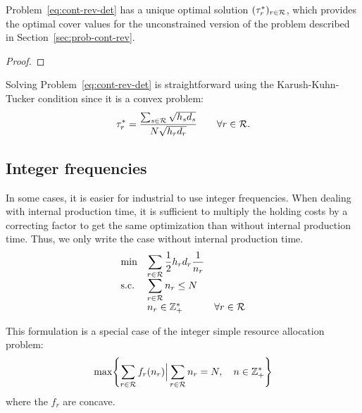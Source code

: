 \begin{prop}
Problem~\eqref{eq:cont-rev-det} has a unique optimal solution $(\tau_r^*)_{r\in\mathcal{R}}$, which provides the optimal cover values for the unconstrained version of the problem described in Section~\ref{sec:prob-cont-rev}.
\end{prop}

\begin{proof}
\tbc
\end{proof}

Solving Problem~\eqref{eq:cont-rev-det} is straightforward using the Karush-Kuhn-Tucker condition since it is a convex problem:
$$\tau_r^*= \frac{\sum_{s\in\mathcal{R}}\sqrt{h_sd_s}}{N\sqrt{h_rd_r}}\qquad\forall r\in\mathcal{R}.$$





\subsection{Integer frequencies}


In some cases, it is easier for industrial to use integer frequencies. When dealing with internal production time, it is sufficient to multiply the holding costs by a correcting factor to get the same optimization than without internal production time. Thus, we only write the case without internal production time.
\begin{equation}
  \begin{array}{lll}
  \min & \displaystyle\sum_{r\in\mathcal{R}} \frac{1}{2}h_rd_r\frac{1}{n_r} \\
  \text{s.c.}  & \displaystyle\sum_{r\in\mathcal{R}} n_r \le N \\
       & n_r \in \mathbb{Z}_+^* & \forall r\in\mathcal{R}
  \end{array}
\end{equation}

This formulation is a special case of the integer simple resource allocation problem:
\begin{equation}
  \max\crbracket{\sum_{r\in\REF} f_r\bracket{\freq_r} \Big| \sum_{r\in\REF}\freq_r=\nbsetups,\quad\freq\in \ZZ_+^*}
\end{equation}
where the $f_r$ are concave.

